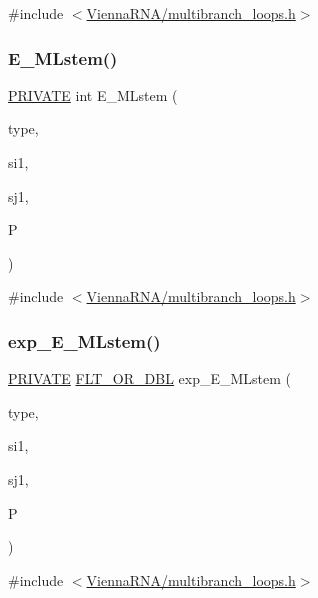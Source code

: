 {\ttfamily \#include $<$\mbox{\hyperlink{multibranch__loops_8h}{Vienna\+R\+N\+A/multibranch\+\_\+loops.\+h}}$>$}

\mbox{\label{group__loops_ga24f7234dbe63dab516e7ea993a3e9f2c}} 
\subsubsection{\texorpdfstring{E\+\_\+\+M\+Lstem()}{E\_MLstem()}}
{\footnotesize\ttfamily \mbox{\hyperlink{group__utils_ga5e151c615eda34903514212f05a5ccf8}{P\+R\+I\+V\+A\+TE}} int E\+\_\+\+M\+Lstem (\begin{DoxyParamCaption}\item[{int}]{type,  }\item[{int}]{si1,  }\item[{int}]{sj1,  }\item[{\mbox{\hyperlink{group__energy__parameters_ga8a69ca7d787e4fd6079914f5343a1f35}{vrna\+\_\+param\+\_\+t}} $\ast$}]{P }\end{DoxyParamCaption})}



{\ttfamily \#include $<$\mbox{\hyperlink{multibranch__loops_8h}{Vienna\+R\+N\+A/multibranch\+\_\+loops.\+h}}$>$}

\mbox{\label{group__loops_gaeb3cb71cfa2fcc27f9f3da1d51e093ec}} 
\subsubsection{\texorpdfstring{exp\+\_\+\+E\+\_\+\+M\+Lstem()}{exp\_E\_MLstem()}}
{\footnotesize\ttfamily \mbox{\hyperlink{group__utils_ga5e151c615eda34903514212f05a5ccf8}{P\+R\+I\+V\+A\+TE}} \mbox{\hyperlink{group__data__structures_ga31125aeace516926bf7f251f759b6126}{F\+L\+T\+\_\+\+O\+R\+\_\+\+D\+BL}} exp\+\_\+\+E\+\_\+\+M\+Lstem (\begin{DoxyParamCaption}\item[{int}]{type,  }\item[{int}]{si1,  }\item[{int}]{sj1,  }\item[{\mbox{\hyperlink{group__energy__parameters_ga01d8b92fe734df8d79a6169482c7d8d8}{vrna\+\_\+exp\+\_\+param\+\_\+t}} $\ast$}]{P }\end{DoxyParamCaption})}



{\ttfamily \#include $<$\mbox{\hyperlink{multibranch__loops_8h}{Vienna\+R\+N\+A/multibranch\+\_\+loops.\+h}}$>$}

